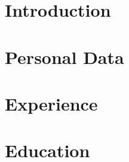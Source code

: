 \documentclass[a4paper]{article}
\begin{document}
\section{Introduction}


\section{Personal Data}


\section{Experience}


\section{Education}

\end{document}
